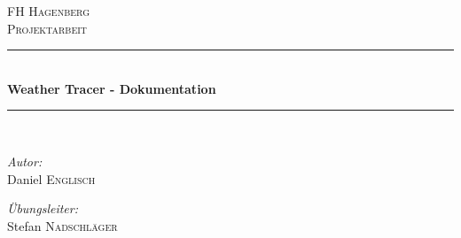 \documentclass[12pt, letterpaper]{article}
\begin{document}

\begin{titlepage} %
\newcommand{\HRule}{\rule{\linewidth}{0.5mm}} %

\center %
 

\textsc{\LARGE FH Hagenberg}\\[1.5cm] %
\textsc{\Large Projektarbeit}\\[0.5cm] %


\HRule \\[0.4cm]
{ \huge \bfseries Weather Tracer - Dokumentation}\\[0.4cm] %
\HRule \\[1.5cm]


\begin{minipage}{0.9\textwidth}
\begin{flushleft} \large
\emph{Autor:}\\
Daniel \textsc{Englisch}\\
\end{flushleft}
\end{minipage}

\begin{minipage}{0.9\textwidth}
\begin{flushright} \large
\emph{Übungsleiter:} \\
Stefan \textsc{Nadschläger} %
\end{flushright}
\end{minipage}\\[2cm]



\end{titlepage}
\end{document}
